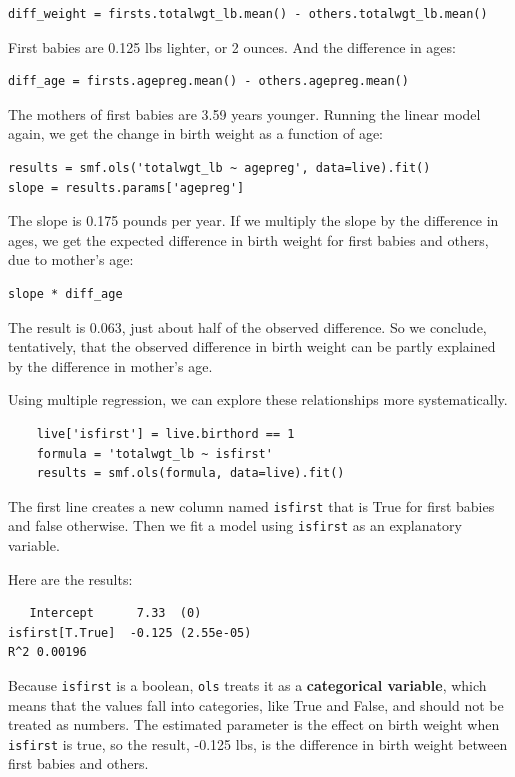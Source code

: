 \documentclass[12pt]{book}
\begin{document}
\begin{verbatim}
diff_weight = firsts.totalwgt_lb.mean() - others.totalwgt_lb.mean()
\end{verbatim}

First babies are 0.125 lbs lighter, or 2 ounces.  And the difference
in ages:

\begin{verbatim}
diff_age = firsts.agepreg.mean() - others.agepreg.mean()
\end{verbatim}

The mothers of first babies are 3.59 years younger.  Running the
linear model again, we get the change in birth weight as a function
of age:

\begin{verbatim}
results = smf.ols('totalwgt_lb ~ agepreg', data=live).fit()
slope = results.params['agepreg']
\end{verbatim}

The slope is 0.175 pounds per year.  If we multiply the slope by
the difference in ages, we get the expected difference in birth
weight for first babies and others, due to mother's age:

\begin{verbatim}
slope * diff_age
\end{verbatim}

The result is 0.063, just about half of the observed difference.
So we conclude, tentatively, that the observed difference in birth
weight can be partly explained by the difference in mother's age. 

Using multiple regression, we can explore these relationships
more systematically.

\begin{verbatim}
    live['isfirst'] = live.birthord == 1
    formula = 'totalwgt_lb ~ isfirst'
    results = smf.ols(formula, data=live).fit()
\end{verbatim}

The first line creates a new column named {\tt isfirst} that is
True for first babies and false otherwise.  Then we fit a model
using {\tt isfirst} as an explanatory variable.

Here are the results:

\begin{verbatim}
   Intercept	  7.33	(0)
isfirst[T.True]  -0.125	(2.55e-05)
R^2 0.00196
\end{verbatim}

Because {\tt isfirst} is a boolean, {\tt ols} treats it as a
{\bf categorical variable}, which means that the values fall
into categories, like True and False, and should not be treated
as numbers.  The estimated parameter is the effect on birth
weight when {\tt isfirst} is true, so the result,
-0.125 lbs, is the difference in
birth weight between first babies and others.  
\end{document}
